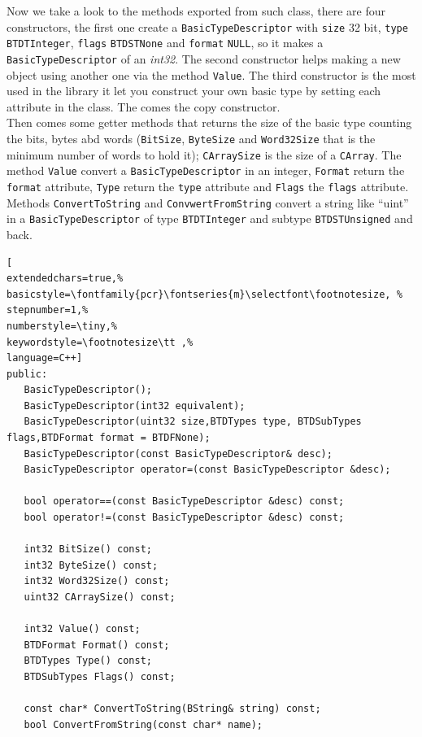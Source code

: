 Now we take a look to the methods exported from such class, there are four constructors, the first one create a \texttt{BasicTypeDescriptor} with \texttt{size} 32 bit, \texttt{type} \texttt{BTDTInteger}, \texttt{flags} \texttt{BTDSTNone} and \texttt{format} \texttt{NULL}, so it makes a \texttt{BasicTypeDescriptor} of an \textit{int32}. The second constructor helps making a new object using another one via the method \texttt{Value}. The third constructor is the most used in the library it let you construct your own basic type by setting each attribute in the class. The comes the copy constructor. \\


Then comes some getter methods that returns the size of the basic type counting the bits, bytes abd words (\texttt{BitSize}, \texttt{ByteSize} and \texttt{Word32Size} that is the minimum number of words to hold it); \texttt{CArraySize} is the size of a \texttt{CArray}. The method \texttt{Value} convert a \texttt{BasicTypeDescriptor} in an integer, \texttt{Format} return the \texttt{format} attribute, \texttt{Type} return the \texttt{type} attribute and \texttt{Flags} the \texttt{flags} attribute. \\


Methods \texttt{ConvertToString} and \texttt{ConvwertFromString} convert a string like ``uint'' in a \texttt{BasicTypeDescriptor} of type \texttt{BTDTInteger} and subtype \texttt{BTDSTUnsigned} and back.


\begin{lstlisting}[
extendedchars=true,%
basicstyle=\fontfamily{pcr}\fontseries{m}\selectfont\footnotesize, %
stepnumber=1,%
numberstyle=\tiny,%
keywordstyle=\footnotesize\tt ,%
language=C++]
public:
   BasicTypeDescriptor();
   BasicTypeDescriptor(int32 equivalent);
   BasicTypeDescriptor(uint32 size,BTDTypes type, BTDSubTypes flags,BTDFormat format = BTDFNone);
   BasicTypeDescriptor(const BasicTypeDescriptor& desc);
   BasicTypeDescriptor operator=(const BasicTypeDescriptor &desc);

   bool operator==(const BasicTypeDescriptor &desc) const;
   bool operator!=(const BasicTypeDescriptor &desc) const;

   int32 BitSize() const;
   int32 ByteSize() const;
   int32 Word32Size() const;
   uint32 CArraySize() const;

   int32 Value() const;
   BTDFormat Format() const;
   BTDTypes Type() const;
   BTDSubTypes Flags() const;

   const char* ConvertToString(BString& string) const;
   bool ConvertFromString(const char* name);
\end{lstlisting}

